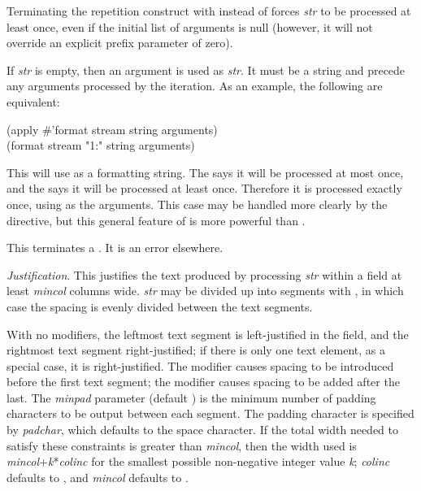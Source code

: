 \begin{flushdesc}
Terminating the repetition construct with \cd{{\Xtilde}:{\Xrbrace}} instead of
\cd{{\Xtilde}{\Xrbrace}} forces {\it str} to be processed at least once, even if
the initial list of arguments is null (however, it will not override an explicit
prefix parameter of zero).

If {\it str} is empty, then an argument is used as {\it str}.  It must be a string
and precede any arguments processed by the iteration.  As an example,
the following are equivalent:
\begin{lisp}
(apply \#'format stream string arguments) \\
(format stream "{\Xtilde}1{\Xlbrace}{\Xtilde}:{\Xrbrace}" string arguments)
\end{lisp}
This will use  as a formatting string.  The  says it will
be processed at most once, and the \cd{{\Xtilde}:{\Xrbrace}} says it will be processed at least once.
Therefore it is processed exactly once, using  as the arguments.
This case may be handled more clearly by the  directive,
but this general feature of \cd{{\Xtilde}{\Xlbrace}}
is more powerful than .

\item[\cd{{\Xtilde}{\Xrbrace}}]
This terminates a \cd{{\Xtilde}{\Xlbrace}}.  It is an error elsewhere.

\item[\cd{{\Xtilde}{\it mincol},{\it colinc},{\it minpad},{\it padchar}<{\it str}{\Xtilde}>}]
{\it Justification}.
This justifies the text produced by processing {\it str}
within a field at least {\it mincol} columns wide.  {\it str}
may be divided up into segments with \cd{{\Xtilde};}, in which case the
spacing is evenly divided between the text segments.

With no modifiers, the leftmost text segment is left-justified in the
field, and the rightmost text segment right-justified;  if there is
only one text element, as a special case, it is right-justified.
The \cd{:} modifier causes
spacing to be introduced before the first text segment;  the \cd{{\Xatsign}}
modifier causes spacing to be added after the last.
The {\it minpad} parameter (default ) is the minimum number of
padding characters to be output between each segment.
The padding character is specified by {\it padchar},
which defaults to the space character.
If the total width needed to satisfy these constraints is greater
than {\it mincol}, then the width used is {\it mincol}+{\it k}*{\it colinc}
for the smallest possible non-negative integer value {\it k};
{\it colinc} defaults to , and {\it mincol} defaults to .


\end{flushdesc}
